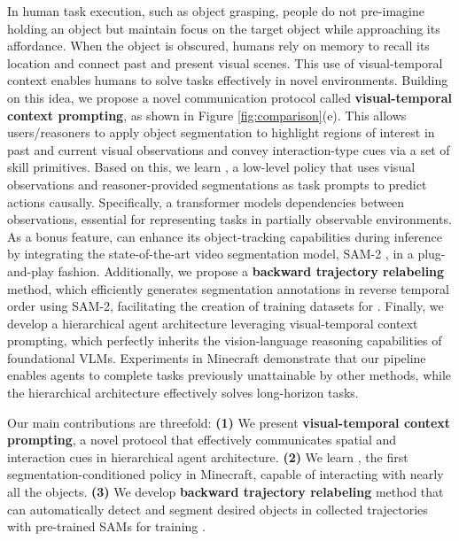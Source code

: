 In human task execution, such as object grasping, people do not pre-imagine holding an object but maintain focus on the target object while approaching its affordance. When the object is obscured, humans rely on memory to recall its location and connect past and present visual scenes. This use of visual-temporal context enables humans to solve tasks effectively in novel environments. 
Building on this idea, we propose a novel communication protocol called \textbf{visual-temporal context prompting}, as shown in Figure \ref{fig:comparison}(e). This allows users/reasoners to apply object segmentation to highlight regions of interest in past and current visual observations and convey interaction-type cues via a set of skill primitives. Based on this, we learn \textbf{\agent}, a low-level policy that uses visual observations and reasoner-provided segmentations as task prompts to predict actions causally. Specifically, a transformer \citep{transformerxl} models dependencies between observations, essential for representing tasks in partially observable environments. As a bonus feature, \agent can enhance its object-tracking capabilities during inference by integrating the state-of-the-art video segmentation model, SAM-2 \citep{sam2}, in a plug-and-play fashion. Additionally, we propose a \textbf{backward trajectory relabeling} method, which efficiently generates segmentation annotations in reverse temporal order using SAM-2, facilitating the creation of training datasets for \agent. 
Finally, we develop a hierarchical agent architecture leveraging visual-temporal context prompting, which perfectly inherits the vision-language reasoning capabilities of foundational VLMs. Experiments in Minecraft demonstrate that our pipeline enables agents to complete tasks previously unattainable by other methods, while the hierarchical architecture effectively solves long-horizon tasks. 

Our main contributions are threefold:
\textbf{(1)} We present \textbf{visual-temporal context prompting}, a novel protocol that effectively communicates spatial and interaction cues in hierarchical agent architecture. 
\textbf{(2)} We learn \textbf{\agent}, the first segmentation-conditioned policy in Minecraft, capable of interacting with nearly all the objects. 
\textbf{(3)} We develop \textbf{backward trajectory relabeling} method that can automatically detect and segment desired objects in collected trajectories with pre-trained SAMs for training \agent. 

